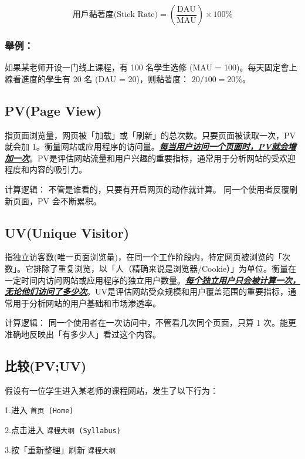 \documentclass[
]{ctexart}
\begin{document}
\[
\text{用戶黏著度(Stick Rate)} = \left( \frac{\text{DAU}}{\text{MAU}} \right) \times 100\%
\]

\subsubsection{舉例：}\label{ux8209ux4f8b}

如果某老师开设一门线上课程，有 100 名學生选修 (MAU =
100)。每天固定會上線看進度的學生有 20 名 (DAU = 20)，则黏著度：
\(20 / 100 = 20\%\)。

\subsection{PV(Page View)}\label{pvpage-view}

指页面浏览量，网页被「加载」或「刷新」的总次数。只要页面被读取一次，PV
就会加
1。衡量网站或应用程序的访问量。\ul{\textbf{\emph{每当用户访问一个页面时，PV就会增加一次}}}。PV是评估网站流量和用户兴趣的重要指标，通常用于分析网站的受欢迎程度和内容的吸引力。

计算逻辑： 不管是谁看的，只要有开启网页的动作就计算。
同一个使用者反覆刷新页面，PV 会不断累积。

\subsection{UV(Unique Visitor)}\label{uvunique-visitor}

指独立访客数(唯一页面浏览量)，在同一个工作阶段内，特定网页被浏览的「次数」。它排除了重复浏览，以「人（精确来说是浏览器/Cookie）」为单位。衡量在一定时间内访问网站或应用程序的独立用户数量。\ul{\textbf{\emph{每个独立用户只会被计算一次，无论他们访问了多少次}}}。UV是评估网站受众规模和用户覆盖范围的重要指标，通常用于分析网站的用户基础和市场渗透率。

计算逻辑： 同一个使用者在一次访问中，不管看几次同个页面，只算 1
次。能更准确地反映出「有多少人」看过这个内容。

\subsection{比较(PV;UV)}\label{ux6bd4ux8f83pvuv}

假设有一位学生进入某老师的课程网站，发生了以下行为：

1.进入 \texttt{首页\ (Home)}

2.点击进入 \texttt{课程大纲\ (Syllabus)}

3.按「重新整理」刷新 \texttt{课程大纲}
\end{document}
